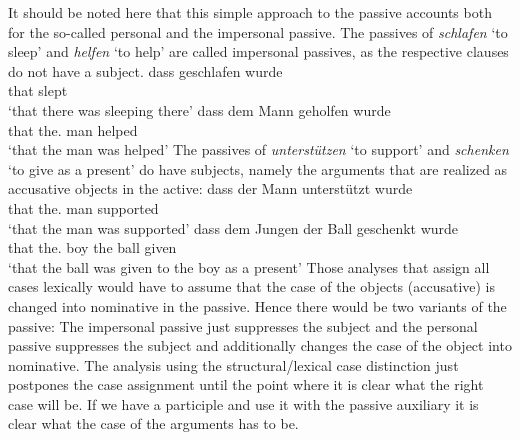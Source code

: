 It should be noted here that this simple approach to the passive accounts both for the so-called
personal and the impersonal passive. The passives of \emph{schlafen} `to sleep' and \emph{helfen}
`to help' are called impersonal passives, as the respective clauses do not have a subject. 
\eal
\ex 
\gll dass geschlafen wurde\\
     that slept      \AUX\\
\glt `that there was sleeping there'
\ex
\gll dass dem Mann geholfen wurde\\
     that the.\DAT{} man helped \AUX\\
\glt `that the man was helped'
\zl
The passives of \emph{unterstützen} `to support' and \emph{schenken} `to give as a present' do have
subjects, namely the arguments that are realized as accusative objects in the active:
\eal
\ex 
\gll dass der Mann unterstützt wurde\\
     that the.\NOM{} man supported \AUX\\
\glt `that the man was supported'
\ex
\gll dass dem Jungen der Ball geschenkt wurde\\
     that the.\DAT{} boy the\NOM{} ball given \AUX\\
\glt `that the ball was given to the boy as a present'
\zl
Those analyses that assign all cases lexically would have to assume that the case of the objects
(accusative) is changed into nominative in the passive. Hence there would be two variants of the
passive: The impersonal passive just suppresses the subject and the personal passive suppresses the
subject and additionally changes the case of the object into nominative. The analysis using the
structural/lexical case distinction just postpones the case assignment until the point where it is
clear what the right case will be. If we have a participle and use it with the passive auxiliary it
is clear what the case of the arguments has to be.





